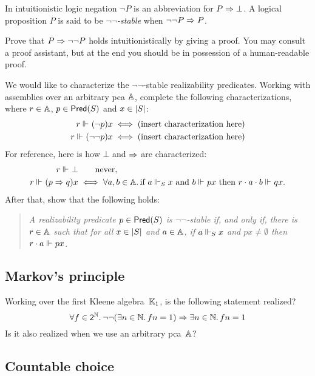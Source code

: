 \documentclass{article}
\begin{document}
In intuitionistic logic negation $\neg P$ is an abbreviation for $P \lthen \bot$. A logical proposition $P$ is said to be \emph{$\neg\neg$-stable} when $\neg\neg P \lthen P$.

Prove that $P \lthen \neg\neg P$ holds intuitionistically by giving a proof. You may consult a proof assistant, but at the end you should be in possession of a human-readable proof.

We would like to characterize the $\neg\neg$-stable realizability predicates. Working with assemblies over an arbitrary pca $\AA$, complete the following characterizations, where $r \in \AA$, $p \in \Pred{S}$ and $x \in \S{S}$:
%
\begin{align*}
  r \rz (\neg p) x &\iff \text{(insert characterization here)} \\
  r \rz (\neg \neg p) x &\iff \text{(insert characterization here)}
\end{align*}
%
For reference, here is how $\bot$ and $\lthen$ are characterized:
%
\begin{align*}
  r \rz \bot &\qquad\text{never}, \\
  r \rz (p \lthen q) x &\iff
    \all{a, b \in \AA} \text{if $a \rz[S] x$ and $b \rz p x$ then $r \cdot a \cdot b \rz q x$}.
\end{align*}
%
After that, show that the following holds:
%
\begin{quote}
  \emph{A realizability predicate $p \in \Pred{S}$ is $\neg\neg$-stable if, and only if, there is $r \in \AA$ such that for all $x \in \S{S}$ and $a \in \AA$, if $a \rz[S] x$ and $p x \neq \emptyset$ then $r \cdot a \rz p x$.
}\end{quote}


\subsection{Markov's principle}
\label{sec:markov-principle}

Working over the first Kleene algebra~$\klone$, is the following statement realized?
%
\begin{equation*}
  \all{f \in \two^\NN}
  \neg\neg(\some{n \in \NN} f n = 1)
  \lthen
  \some{n \in \NN} f n = 1
\end{equation*}
%
Is it also realized when we use an arbitrary pca~$\AA$?

\subsection{Countable choice}
\label{sec:countable-choice}
\end{document}

